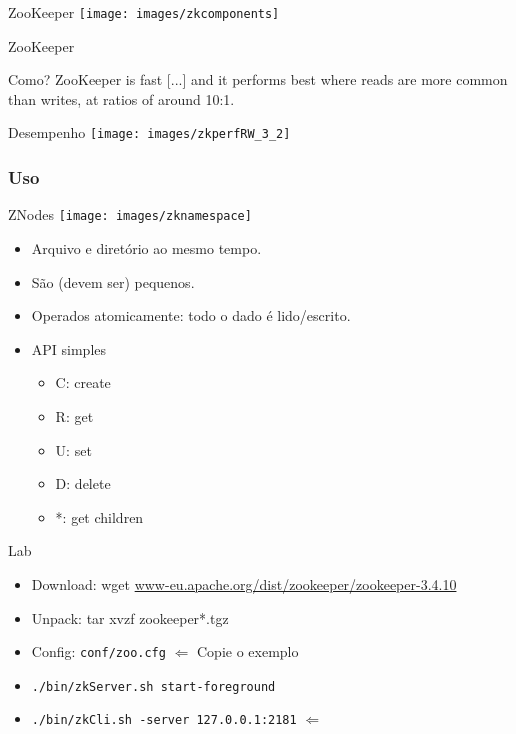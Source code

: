 \begin{frame}{ZooKeeper}
\texttt{[image: images/zkcomponents]}
\end{frame}

\begin{frame}{ZooKeeper}
\begin{block}{Como?}
	ZooKeeper is fast [...] and it performs best where reads are more common than writes, at ratios of around 10:1.
\end{block}
\end{frame}

\begin{frame}{Desempenho}
	\texttt{[image: images/zkperfRW\_3\_2]}
\end{frame}


\subsubsection{Uso}
\begin{frame}{ZNodes}
\texttt{[image: images/zknamespace]}

\begin{itemize}
	\item Arquivo e diretório ao mesmo tempo.
	\item São (devem ser) pequenos.
	\item Operados atomicamente: todo o dado é lido/escrito.
	\item API simples
		\begin{itemize}
			\item C: create
			\item R: get
			\item U: set
			\item D: delete
			\item *: get children
		\end{itemize}
\end{itemize}
\end{frame}


\begin{frame}[fragile]{Lab}
\begin{itemize}
	\item Download: wget \url{www-eu.apache.org/dist/zookeeper/zookeeper-3.4.10}
	\item Unpack: tar xvzf zookeeper*.tgz
	\item Config: \verb|conf/zoo.cfg| $\Leftarrow$ Copie o exemplo\\
	\item \verb|./bin/zkServer.sh start-foreground|
	\item \verb|./bin/zkCli.sh -server 127.0.0.1:2181| $\Leftarrow$
\end{itemize}
\end{frame}


